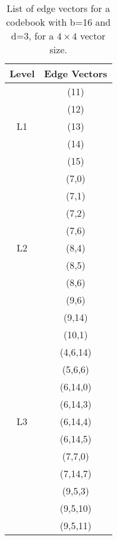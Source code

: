 \begin{table}[!t]
  \renewcommand{\arraystretch}{1.3}
  \centering

  \caption{List of edge vectors for a codebook with b=16 and d=3, for
    a $4 \times 4$ vector size.}
  \label{table3}

  \begin{tabular}{|c|c|} \hline
    Level & Edge Vectors \\ \hline

    & (11)\\
    & (12)\\
    L1 & (13)\\
    & (14)\\
    & (15) \\ \hline

    & (7,0)\\
    & (7,1)\\
    & (7,2)\\
    & (7,6)\\
    L2 & (8,4)\\
    & (8,5)\\
    & (8,6)\\
    & (9,6)\\
    & (9,14)\\
    & (10,1) \\ \hline

    & (4,6,14)\\
    & (5,6,6)\\
    & (6,14,0)\\
    & (6,14,3)\\
    L3 & (6,14,4)\\
    & (6,14,5)\\
    & (7,7,0)\\
    & (7,14,7)\\
    & (9,5,3)\\
    & (9,5,10)\\
    & (9,5,11) \\ \hline

  \end{tabular}

\end{table}

